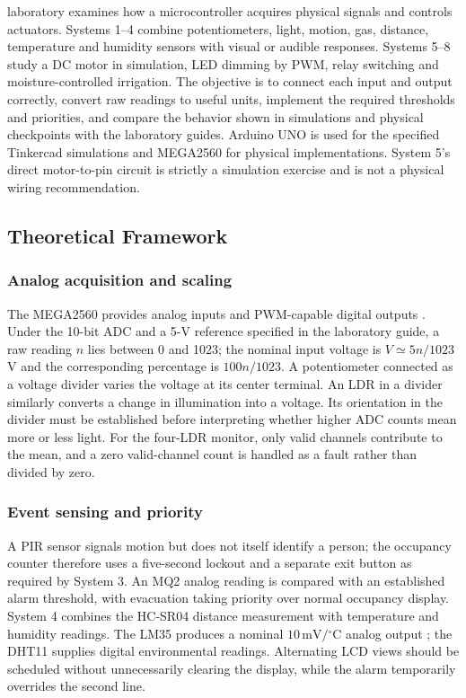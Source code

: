  laboratory examines how a microcontroller acquires
physical signals and controls actuators. Systems 1--4 combine potentiometers,
light, motion, gas, distance, temperature and humidity sensors with visual or
audible responses. Systems 5--8 study a DC motor in simulation, LED dimming by
PWM, relay switching and moisture-controlled irrigation. The objective is to
connect each input and output correctly, convert raw readings to useful units,
implement the required thresholds and priorities, and compare the behavior
shown in simulations and physical checkpoints with the laboratory guides.
Arduino UNO is used for the specified Tinkercad simulations and MEGA2560 for
physical implementations. System 5's direct motor-to-pin circuit is strictly
a simulation exercise and is not a physical wiring recommendation.

\subsection{Theoretical Framework}

\subsubsection{Analog acquisition and scaling}
The MEGA2560 provides analog inputs and PWM-capable digital outputs
\cite{arduinoMega}. Under the 10-bit ADC and a 5-V reference specified in the
laboratory guide, a raw reading $n$ lies between 0 and 1023; the nominal
input voltage is $V\simeq 5n/1023$ V and the corresponding percentage is
$100n/1023$. A potentiometer connected as a voltage divider varies the
voltage at its center terminal. An LDR in a divider similarly converts a
change in illumination into a voltage. Its orientation in the divider must
be established before interpreting whether higher ADC counts mean more or
less light. For the four-LDR monitor, only valid channels contribute to the
mean, and a zero valid-channel count is handled as a fault rather than divided
by zero.

\subsubsection{Event sensing and priority}
A PIR sensor signals motion but does not itself identify a person; the
occupancy counter therefore uses a five-second lockout and a separate exit
button as required by System 3. An MQ2 analog reading is compared with an
established alarm threshold, with evacuation taking priority over normal
occupancy display. System 4 combines the HC-SR04 distance measurement with
temperature and humidity readings. The LM35 produces a nominal
$10\,\mathrm{mV}/{}^{\circ}\mathrm{C}$ analog output \cite{tiLM35}; the
DHT11 supplies digital environmental readings. Alternating LCD views should
be scheduled without unnecessarily clearing the display, while the alarm
temporarily overrides the second line.

